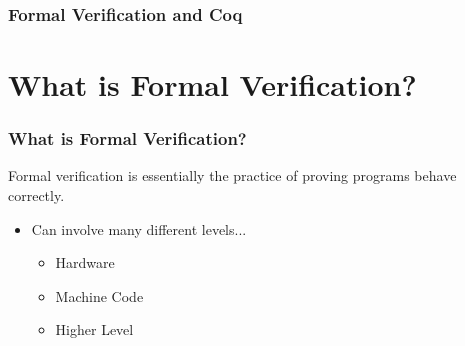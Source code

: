 \documentclass{beamer}
\author{
  Beck, Calvin\\
}
\begin{document}
\begin{frame}
  \frametitle{Formal Verification and Coq}
  \maketitle
\end{frame}

\section{What is Formal Verification?}

\begin{frame}
  \frametitle{What is Formal Verification?}

  Formal verification is essentially the practice of proving programs behave correctly.

  \begin{itemize}
  \item Can involve many different levels...
    \begin{itemize}
    \item Hardware
    \item Machine Code
    \item Higher Level
    \end{itemize}
  \end{itemize}
\end{frame}
\end{document}
